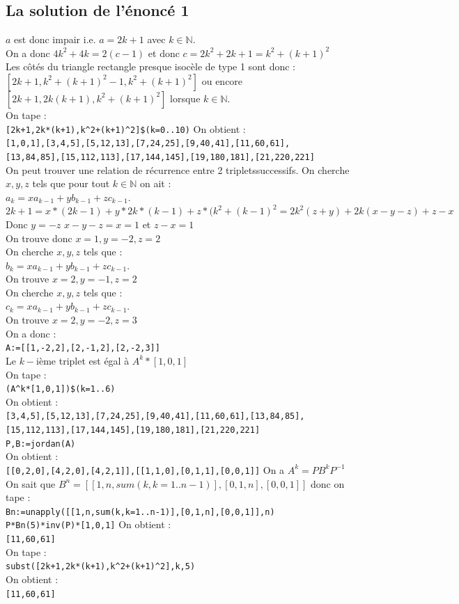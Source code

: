 \documentclass[a4paper,11pt]{book}
\newcommand{\N}{{\mathbb{N}}}
\begin{document}
\subsection{La solution de l'\'enonc\'e 1}
$a$ est donc impair i.e. $a=2k+1$ avec $k\in \N$.\\
On a donc $4k^2+4k=2(c-1)$ et donc $c=2k^2+2k+1=k^2+(k+1)^2$\\
Les c\^ot\'es du triangle rectangle presque isoc\`ele de type 1 sont donc :\\
$[2k+1,k^2+(k+1)^2-1,k^2+(k+1)^2]$ ou encore $[2k+1,2k(k+1),k^2+(k+1)^2]$ 
lorsque $k \in \N$.\\
On tape :\\
{\tt [2k+1,2k*(k+1),k\verb|^|2+(k+1)\verb|^|2]\$(k=0..10)}
On obtient :\\
{\tt [1,0,1],[3,4,5],[5,12,13],[7,24,25],[9,40,41],[11,60,61],}\\
{\tt [13,84,85],[15,112,113],[17,144,145],[19,180,181],[21,220,221]}\\
On peut trouver une relation de r\'ecurrence entre 2 tripletssuccessifs.
On cherche $x,y,z$ tels que pour tout $k\in \N$ on ait :\\
$a_k=xa_{k-1}+yb_{k-1}+zc_{k-1}$.\\
$2k+1=x*(2k-1)+y*2k*(k-1)+z*(k^2+(k-1)^2=2k^2(z+y)+2k(x-y-z)+z-x$
Donc $y=-z$ $x-y-z=x=1$ et $z-x=1$ \\
On trouve donc $x=1,y=-2,z=2$\\
On cherche $x,y,z$ tels que :\\
$b_k=xa_{k-1}+yb_{k-1}+zc_{k-1}$.\\
On trouve $x=2,y=-1, z=2$\\
On cherche $x,y,z$ tels que :\\
$c_k=xa_{k-1}+yb_{k-1}+zc_{k-1}$.\\
On trouve $x=2,y=-2, z=3$\\
On a donc :\\
{\tt A:=[[1,-2,2],[2,-1,2],[2,-2,3]]}\\
Le $k-$i\`eme triplet est \'egal \`a $A^k*[1,0,1]$\\
On tape :\\
{\tt (A\verb|^|k*[1,0,1])\$(k=1..6) }\\
On obtient :\\
{\tt  [3,4,5],[5,12,13],[7,24,25],[9,40,41],[11,60,61],[13,84,85],}\\
{\tt [15,112,113],[17,144,145],[19,180,181],[21,220,221]}\\
{\tt P,B:=jordan(A)}\\
On obtient :\\
{\tt [[0,2,0],[4,2,0],[4,2,1]],[[1,1,0],[0,1,1],[0,0,1]]}
On a $A^k=PB^kP^{-1}$
On sait que $B^n=[[1,n,sum(k,k=1..n-1)],[0,1,n],[0,0,1]]$ donc on tape :\\
{\tt Bn:=unapply([[1,n,sum(k,k=1..n-1)],[0,1,n],[0,0,1]],n)}\\
{\tt P*Bn(5)*inv(P)*[1,0,1]}
On obtient :\\
{\tt [11,60,61]}\\
On tape :\\
{\tt subst([2k+1,2k*(k+1),k\verb|^|2+(k+1)\verb|^|2],k,5)}\\
On obtient :\\
{\tt [11,60,61]}
\end{document}
